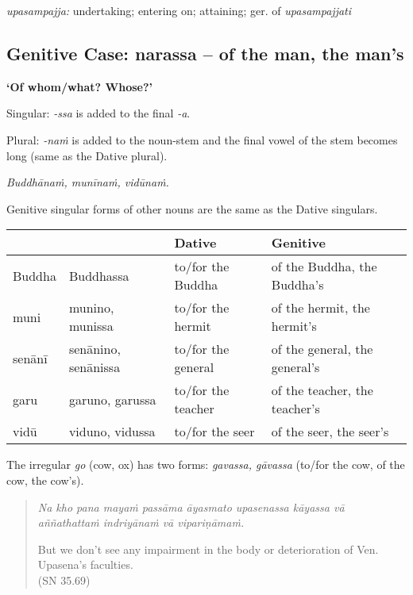 \documentclass[11pt,oneside]{memoir}
\begin{document}
\normalArrayStrech

\emph{upasampajja:} undertaking; entering on; attaining; ger. of \emph{upasampajjati}

\clearpage

\subsection{Genitive Case: narassa -- of the man, the man's}
\label{sec:org9716959}

\textbf{`Of whom/what? Whose?'}

Singular: \emph{-ssa} is added to the final \emph{-a}.

Plural: \emph{-naṁ} is added to the noun-stem and the final vowel of the stem becomes long (same as the Dative plural).

\emph{Buddhānaṁ, munīnaṁ, vidūnaṁ.}

Genitive singular forms of other nouns are the same as the Dative singulars.

\begin{center}
\begin{tabular}{llll}
 &  & Dative & Genitive\\[0pt]
\hline
Buddha & Buddhassa & to/for the Buddha & of the Buddha, the Buddha's\\[0pt]
muni & munino, munissa & to/for the hermit & of the hermit, the hermit's\\[0pt]
senānī & senānino, senānissa & to/for the general & of the general, the general's\\[0pt]
garu & garuno, garussa & to/for the teacher & of the teacher, the teacher's\\[0pt]
vidū & viduno, vidussa & to/for the seer & of the seer, the seer's\\[0pt]
\end{tabular}
\end{center}

The irregular \emph{go} (cow, ox) has two forms: \emph{gavassa, gāvassa} (to/for the cow, of the cow, the cow's).

\begin{quote}
\emph{Na kho pana mayaṁ passāma āyasmato upasenassa kāyassa vā aññathattaṁ indriyānaṁ vā vipariṇāmaṁ.}

But we don't see any impairment in the body or deterioration of Ven. Upasena's faculties. \\[0pt]
(SN 35.69)
\end{quote}

\renewcommand{\arraystretch}{1.7}
\end{document}
